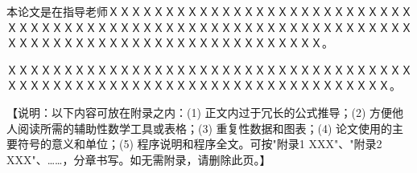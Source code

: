 \documentclass[a4paper]{ltxdoc}
\numberwithin{equation}{section}
\begin{document}
{
\clearpage %
\nocite{*} %
\wuhao
\setlength{\baselineskip}{20pt}
}

\begin{acknowledge}
本论文是在指导老师ＸＸＸＸＸＸＸＸＸＸＸＸＸＸＸＸＸＸＸＸＸＸＸＸＸＸＸＸＸＸＸＸＸＸＸＸＸＸＸＸＸＸＸＸＸＸＸＸＸＸＸＸＸＸＸＸＸＸＸＸＸＸＸＸＸＸＸＸＸＸＸＸＸＸＸＸＸＸＸＸＸＸＸＸＸＸＸＸＸＸＸ。

ＸＸＸＸＸＸＸＸＸＸＸＸＸＸＸＸＸＸＸＸＸＸＸＸＸＸＸＸＸＸＸＸＸＸＸＸＸＸＸＸＸＸＸＸＸＸＸＸＸＸＸＸＸＸＸＸＸＸＸＸＸＸＸＸＸＸＸＸＸＸ。
\end{acknowledge}

\begin{appendix}
【说明：以下内容可放在附录之内：(1) 正文内过于冗长的公式推导；(2) 方便他人阅读所需的辅助性数学工具或表格；(3) 重复性数据和图表；(4) 论文使用的主要符号的意义和单位；(5) 程序说明和程序全文。可按"附录1  XXX"、"附录2  XXX"、……，分章书写。如无需附录，请删除此页。】
\end{appendix}
\end{document}
